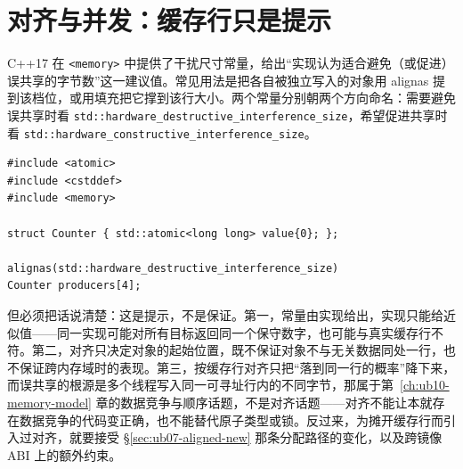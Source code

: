 \documentclass[12pt,a4paper,fontset=fandol]{ctexbook}
\newcommand{\cpp}[1]{C++#1}
\newcommand{\Tp}[1]{\texttt{#1}}
\newcommand{\Lang}[1]{\textsf{#1}}
\newcommand{\Hdr}[1]{\texttt{<#1>}}
\begin{document}
\section{对齐与并发：缓存行只是提示}\label{sec:ub07-concurrency}

\cpp{17} 在 \Hdr{memory} 中提供了干扰尺寸常量，给出“实现认为适合避免（或促进）误共享的字节数”这一建议值。常见用法是把各自被独立写入的对象用 \Lang{alignas} 提到该档位，或用填充把它撑到该行大小。两个常量分别朝两个方向命名：需要避免误共享时看 \Tp{std::hardware\_destructive\_interference\_size}，希望促进共享时看 \Tp{std::hardware\_constructive\_interference\_size}。

\begin{lstlisting}[style=cppstyle,caption={用干扰尺寸常量把独立写入的计数器摊开}]
#include <atomic>
#include <cstddef>
#include <memory>

struct Counter { std::atomic<long long> value{0}; };

alignas(std::hardware_destructive_interference_size)
Counter producers[4];
\end{lstlisting}

但必须把话说清楚：这是提示，不是保证。第一，常量由实现给出，实现只能给近似值——同一实现可能对所有目标返回同一个保守数字，也可能与真实缓存行不符。第二，对齐只决定对象的起始位置，既不保证对象不与无关数据同处一行，也不保证跨内存域时的表现。第三，按缓存行对齐只把“落到同一行的概率”降下来，而误共享的根源是多个线程写入同一可寻址行内的不同字节，那属于第~\ref{ch:ub10-memory-model} 章的数据竞争与顺序话题，不是对齐话题——对齐不能让本就存在数据竞争的代码变正确，也不能替代原子类型或锁。反过来，为摊开缓存行而引入过对齐，就要接受 §\ref{sec:ub07-aligned-new} 那条分配路径的变化，以及跨镜像 ABI 上的额外约束。
\end{document}
